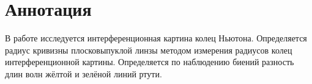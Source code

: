\section*{Аннотация}

В работе исследуется интерференционная картина колец Ньютона. Определяется 
радиус кривизны плосковыпуклой линзы методом измерения радиусов колец 
интерференционной картины. Определяется по наблюдению биений разность длин волн 
жёлтой и зелёной линий ртути.